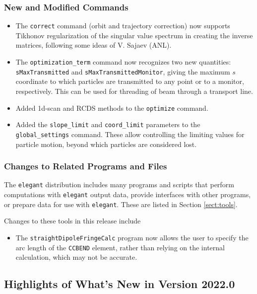 \documentclass[11pt]{article}
\begin{document}
\subsubsection{New and Modified Commands}
\begin{itemize}
\item The \verb|correct| command (orbit and trajectory correction) now supports Tikhonov regularization of the
  singular value spectrum in creating the inverse matrices, following some ideas of V. Sajaev (ANL).
\item The \verb|optimization_term| command now recognizes two new quantities: \verb|sMaxTransmitted| and 
  \verb|sMaxTransmittedMonitor|, giving the maximum $s$ coordinate to which particles are transmitted to
  any point or to a monitor, respectively. This can be used for threading of beam through a transport line.
\item Added 1d-scan and RCDS \cite{Huang-RCDS} methods to the \verb|optimize| command.
\item Added the \verb|slope_limit| and \verb|coord_limit| parameters to the \verb|global_settings| command.
  These allow controlling the limiting values for particle motion, beyond which particles are considered lost.
\end{itemize}

\subsubsection{Changes to Related Programs and Files}

The {\tt elegant} distribution includes many programs and scripts that perform computations with {\tt elegant}
output data, provide interfaces with other programs, or prepare data for use with {\tt elegant}. These
are listed in Section \ref{sect:tools}. 

Changes to these tools in this release include
\begin{itemize}
\item The \verb|straightDipoleFringeCalc| program now allows the user to specify the arc length of the
  \verb|CCBEND| element, rather than relying on the internal calculation, which may not be accurate.
\end{itemize}

\subsection{Highlights of What's New in Version 2022.0}
\end{document}
